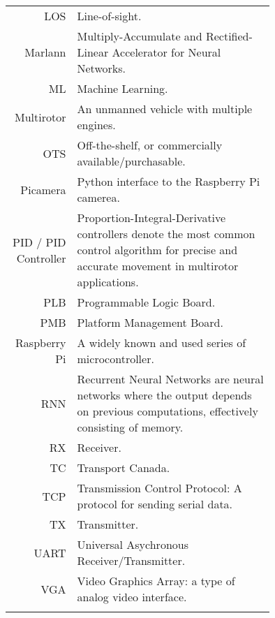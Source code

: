 \begin{tabular}[h]{rp{0.75\linewidth}}
    LOS & Line-of-sight.\\
    Marlann & Multiply-Accumulate and Rectified-Linear Accelerator for Neural Networks. \\
    ML & Machine Learning.\\
    Multirotor & An unmanned vehicle with multiple engines. \\
    OTS & Off-the-shelf, or commercially available/purchasable. \\
    Picamera & Python interface to the Raspberry Pi camerea. \\
    PID / PID Controller & Proportion-Integral-Derivative controllers denote the most common control algorithm for precise and accurate movement in multirotor applications.\cite{pid}\\
    PLB & Programmable Logic Board. \\
    PMB & Platform Management Board. \\
    Raspberry Pi & A widely known and used series of microcontroller. \\
    RNN & Recurrent Neural Networks are neural networks where the output depends on previous computations, effectively consisting of memory.\cite{rnn}\\
    RX & Receiver.\\
    TC & Transport Canada.\\
    TCP & Transmission Control Protocol: A protocol for sending serial data. \\
    TX & Transmitter.\\\
    UART & Universal Asychronous Receiver/Transmitter. \\
    VGA & Video Graphics Array: a type of analog video interface. \\
     & \\

    \hline

\end{tabular}

